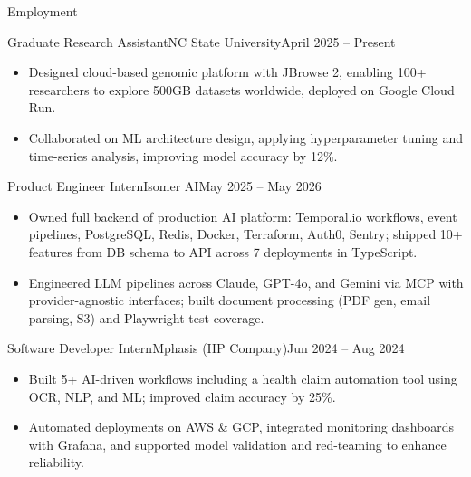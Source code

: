 \documentclass[]{mcdowellcv}
\begin{document}
\makeheader

\begin{cvsection}{Employment}
  \begin{cvsubsection}{Graduate Research Assistant}{NC State University}{April 2025 -- Present}
    \begin{itemize}
      \item Designed cloud-based genomic platform with JBrowse 2, enabling 100+ researchers to explore 500GB datasets worldwide, deployed on Google Cloud Run.
      \item Collaborated on ML architecture design, applying hyperparameter tuning and time-series analysis, improving model accuracy by 12\%.
    \end{itemize}
    \vspace{-1.5pt}
  \end{cvsubsection}

  \begin{cvsubsection}{Product Engineer Intern}{Isomer AI}{May 2025 -- May 2026}
    \begin{itemize}
      \item Owned full backend of production AI platform: Temporal.io workflows, event pipelines, PostgreSQL, Redis, Docker, Terraform, Auth0, Sentry; shipped 10+ features from DB schema to API across 7 deployments in TypeScript.
      \item Engineered LLM pipelines across Claude, GPT-4o, and Gemini via MCP with provider-agnostic interfaces; built document processing (PDF gen, email parsing, S3) and Playwright test coverage.
    \end{itemize}
    \vspace{-1.5pt}
  \end{cvsubsection}

  \begin{cvsubsection}{Software Developer Intern}{Mphasis (HP Company)}{Jun 2024 -- Aug 2024}
    \begin{itemize}
      \item Built 5+ AI-driven workflows including a health claim automation tool using OCR, NLP, and ML; improved claim accuracy by 25\%.
      \item Automated deployments on AWS \& GCP, integrated monitoring dashboards with Grafana, and supported model validation and red-teaming to enhance reliability.
    \end{itemize}
    \vspace{-1.5pt}
  \end{cvsubsection}


\end{cvsection}
\end{document}
